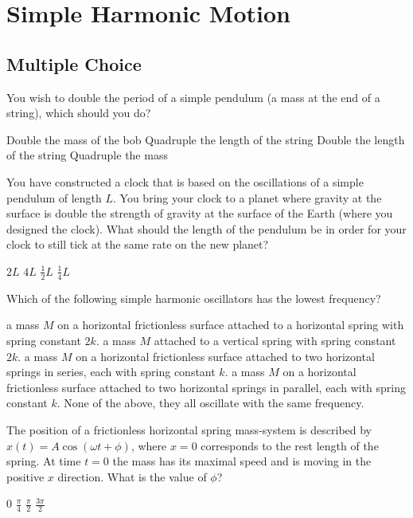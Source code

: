 \section{Simple Harmonic Motion}

\subsection{Multiple Choice}

\question You wish to double the period of a simple pendulum (a mass at the end of a string), which should you do?
\begin{checkboxes}
	\choice Double the mass of the bob
	\CorrectChoice Quadruple the length of the string
	\choice Double the length of the string
	\choice Quadruple the mass
\end{checkboxes}

\question You have constructed a clock that is based on the oscillations of a simple pendulum of length $L$. You bring your clock to a planet where gravity at the surface is double the strength of gravity at the surface of the Earth (where you designed the clock). What should the length of the pendulum be in order for your clock to still tick at the same rate on the new planet?
\begin{checkboxes}
	\CorrectChoice $2L$
	\choice $4L$
	\choice $\frac{1}{2}L$
	\choice $\frac{1}{4}L$
\end{checkboxes}

\question Which of the following simple harmonic oscillators has the lowest frequency?
\begin{checkboxes}
	\choice a mass $M$ on a horizontal frictionless surface attached to a horizontal spring with spring constant $2k$.
	\choice a mass $M$ attached to a vertical spring with spring constant $2k$.
	\CorrectChoice a mass $M$ on a horizontal frictionless surface attached to two horizontal springs in series, each with spring constant $k$.
	\choice a mass $M$ on a horizontal frictionless surface attached to two horizontal springs in parallel, each with spring constant $k$.
	\choice None of the above, they all oscillate with the same frequency.
\end{checkboxes}

\question The position of a frictionless horizontal spring mass-system is described by $x(t)=A\cos(\omega t + \phi)$, where $x=0$ corresponds to the rest length of the spring. At time $t=0$ the mass has its maximal speed and is moving in the positive $x$ direction. What is the value of $\phi$?
\begin{checkboxes}
	\choice $0$
	\choice $\frac{\pi}{4}$
	\choice $\frac{\pi}{2}$
	\CorrectChoice $\frac{3\pi}{2}$
\end{checkboxes}

